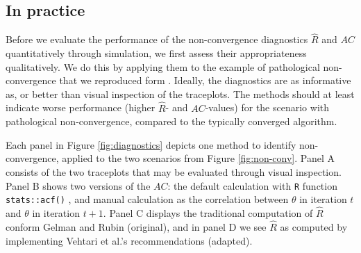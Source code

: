 \documentclass[Royal,times,sageh]{sagej}
\begin{document}
\hypertarget{in-practice}{%
\subsection{In practice}\label{in-practice}}

Before we evaluate the performance of the non-convergence diagnostics \(\widehat{R}\) and \(AC\) quantitatively through simulation, we first assess their appropriateness qualitatively. We do this by applying them to the example of pathological non-convergence that we reproduced form \citet{buur18}. Ideally, the diagnostics are as informative as, or better than visual inspection of the traceplots. The methods should at least indicate worse performance (higher \(\widehat{R}\)- and \(AC\)-values) for the scenario with pathological non-convergence, compared to the typically converged algorithm.

Each panel in Figure \ref{fig:diagnostics} depicts one method to identify non-convergence, applied to the two scenarios from Figure \ref{fig:non-conv}. Panel A consists of the two traceplots that may be evaluated through visual inspection. Panel B shows two versions of the \(AC\): the default calculation with \texttt{R} function \texttt{stats::acf()} \citep{R}, and manual calculation as the correlation between \(\theta\) in iteration \(t\) and \(\theta\) in iteration \(t+1\). Panel C displays the traditional computation of \(\widehat{R}\) conform Gelman and Rubin (original), and in panel D we see \(\widehat{R}\) as computed by implementing Vehtari et al.'s recommendations (adapted).
\end{document}
